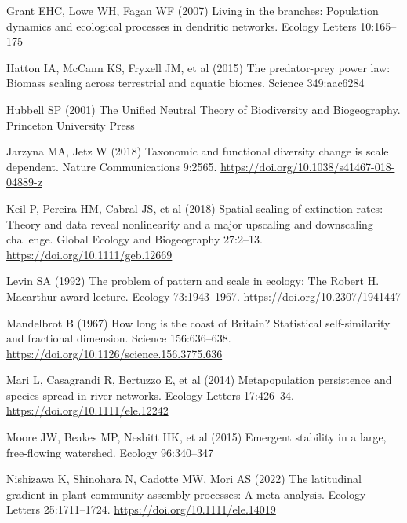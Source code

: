 \documentclass[
  12pt,
]{article}
\newlength{\cslhangindent}
\newlength{\cslentryspacingunit} %
\newenvironment{CSLReferences}[2] %
 {%
  \setlength{\parindent}{0pt}
  \ifodd #1
  \let\oldpar\par
  \def\par{\hangindent=\cslhangindent\oldpar}
  \fi
  \setlength{\parskip}{#2\cslentryspacingunit}
 }%
 {}
\begin{document}
\begin{CSLReferences}{1}{0}
\leavevmode{}%
Grant EHC, Lowe WH, Fagan WF (2007) Living in the branches: Population dynamics and ecological processes in dendritic networks. Ecology Letters 10:165--175

\leavevmode{}%
Hatton IA, McCann KS, Fryxell JM, et al (2015) The predator-prey power law: {Biomass} scaling across terrestrial and aquatic biomes. Science 349:aac6284

\leavevmode{}%
Hubbell SP (2001) The {Unified Neutral Theory} of {Biodiversity} and {Biogeography}. {Princeton University Press}

\leavevmode{}%
Jarzyna MA, Jetz W (2018) Taxonomic and functional diversity change is scale dependent. Nature Communications 9:2565. \url{https://doi.org/10.1038/s41467-018-04889-z}

\leavevmode{}%
Keil P, Pereira HM, Cabral JS, et al (2018) Spatial scaling of extinction rates: {Theory} and data reveal nonlinearity and a major upscaling and downscaling challenge. Global Ecology and Biogeography 27:2--13. \url{https://doi.org/10.1111/geb.12669}

\leavevmode{}%
Levin SA (1992) The problem of pattern and scale in ecology: The {Robert H}. {Macarthur} award lecture. Ecology 73:1943--1967. \url{https://doi.org/10.2307/1941447}

\leavevmode{}%
Mandelbrot B (1967) How long is the coast of {Britain}? {Statistical} self-similarity and fractional dimension. Science 156:636--638. \url{https://doi.org/10.1126/science.156.3775.636}

\leavevmode{}%
Mari L, Casagrandi R, Bertuzzo E, et al (2014) Metapopulation persistence and species spread in river networks. Ecology Letters 17:426--34. \url{https://doi.org/10.1111/ele.12242}

\leavevmode{}%
Moore JW, Beakes MP, Nesbitt HK, et al (2015) Emergent stability in a large, free-flowing watershed. Ecology 96:340--347

\leavevmode{}%
Nishizawa K, Shinohara N, Cadotte MW, Mori AS (2022) The latitudinal gradient in plant community assembly processes: {A} meta-analysis. Ecology Letters 25:1711--1724. \url{https://doi.org/10.1111/ele.14019}


\end{CSLReferences}
\end{document}
